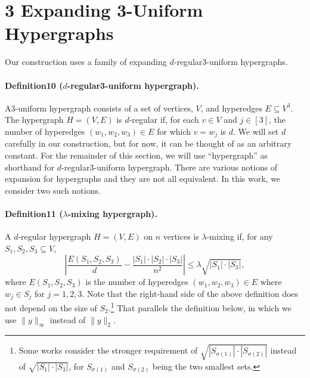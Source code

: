 \documentclass[10pt,a4paper]{article}
\begin{document}
\section*{3 Expanding 3-Uniform Hypergraphs}
Our construction uses a family of expanding $d$-regular3-uniform hypergraphs.
\paragraph{Definition10 ($d$-regular3-uniform hypergraph).} A3-uniform hypergraph consists of a set of vertices, $V$, and hyperedges $E\subseteq V^3$. The hypergraph $H=(V,E)$ is $d$-regular if, for each $v\in V$ and $j\in[3]$, the number of hyperedges $(w_1,w_2,w_3)\in E$ for which $v=w_j$ is $d$.
We will set $d$ carefully in our construction, but for now, it can be thought of as an arbitrary constant. For the remainder of this section, we will use ``hypergraph'' as shorthand for $d$-regular3-uniform hypergraph. There are various notions of expansion for hypergraphs and they are not all equivalent. In this work, we consider two such notions.
\paragraph{Definition11 ($\lambda$-mixing hypergraph).} A $d$-regular hypergraph $H=(V,E)$ on $n$ vertices is $\lambda$-mixing if, for any $S_1,S_2,S_3\subseteq V$,
\[\left|\frac{E(S_1,S_2,S_3)}d-\frac{|S_1|\cdot|S_2|\cdot|S_3|}{n^2}\right|\leq\lambda\sqrt{|S_1|\cdot|S_3|},\tag{2}\]
where $E(S_1,S_2,S_3)$ is the number of hyperedges $(w_1,w_2,w_3)\in E$ where $w_j\in S_j$ for $j=1,2,3$.
Note that the right-hand side of the above definition does not depend on the size of $S_2$.\footnote{Some works consider the stronger requirement of $\sqrt{|S_{\sigma(1)}|\cdot|S_{\sigma(2)}|}$ instead of $\sqrt{|S_1|\cdot|S_3|}$, for $S_{\sigma(1)}$ and $S_{\sigma(2)}$ being the two smallest sets.} That parallels the definition below, in which we use $\|y\|_{\infty}$ instead of $\|y\|_2$.
\end{document}
